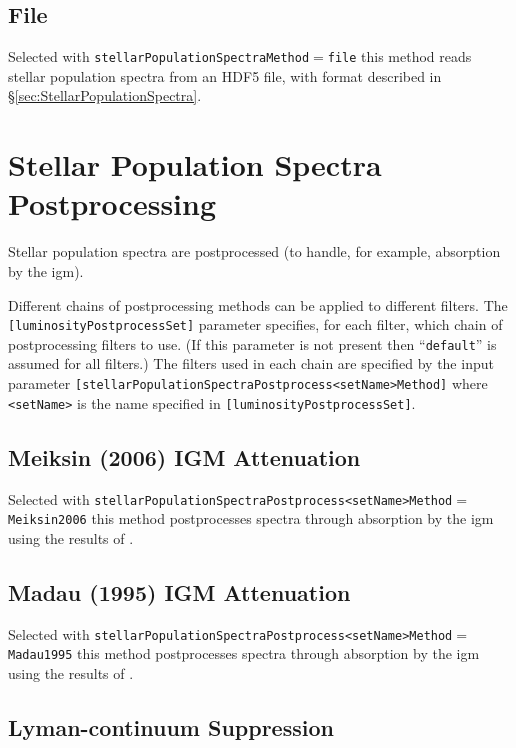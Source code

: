 \subsection{File}

Selected with {\tt stellarPopulationSpectraMethod}$=${\tt file} this method reads stellar population spectra from an HDF5 file, with format described in \S\ref{sec:StellarPopulationSpectra}.

\section{Stellar Population Spectra Postprocessing}

Stellar population spectra are postprocessed (to handle, for example, absorption by the \gls{igm}).

Different chains of postprocessing methods can be applied to different filters. The {\tt [luminosityPostprocessSet]} parameter specifies, for each filter, which chain of postprocessing filters to use. (If this parameter is not present then ``{\tt default}'' is assumed for all filters.) The filters used in each chain are specified by the input parameter {\tt [stellarPopulationSpectraPostprocess\textless setName\textgreater Method]} where {\tt \textless setName\textgreater} is the name specified in {\tt [luminosityPostprocessSet]}.

\subsection{Meiksin (2006) IGM Attenuation}

Selected with {\tt stellarPopulationSpectraPostprocess\textless setName\textgreater Method}$=${\tt Meiksin2006} this method postprocesses spectra through absorption by the \gls{igm} using the results of \cite{meiksin_colour_2006}.

\subsection{Madau (1995) IGM Attenuation}

Selected with {\tt stellarPopulationSpectraPostprocess\textless setName\textgreater Method}$=${\tt Madau1995} this method postprocesses spectra through absorption by the \gls{igm} using the results of \cite{madau_radiative_1995}.

\subsection{Lyman-continuum Suppression}

